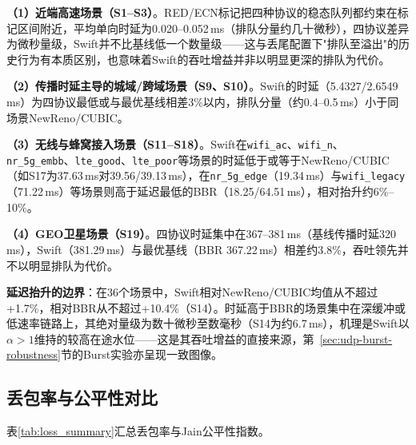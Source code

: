 \textbf{（1）近端高速场景（S1--S3）}。RED/ECN标记把四种协议的稳态队列都约束在标记区间附近，平均单向时延为0.020--0.052\,ms（排队分量约几十微秒），四协议差异为微秒量级，Swift并不比基线低一个数量级——这与丢尾配置下"排队至溢出"的历史行为有本质区别，也意味着Swift的吞吐增益并非以明显更深的排队为代价。

\textbf{（2）传播时延主导的城域/跨域场景（S9、S10）}。Swift的时延（5.4327/2.6549\,ms）为四协议最低或与最优基线相差3\%以内，排队分量（约0.4--0.5\,ms）小于同场景NewReno/CUBIC。

\textbf{（3）无线与蜂窝接入场景（S11--S18）}。Swift在\texttt{wifi\_ac}、\texttt{wifi\_n}、\texttt{nr\_5g\_embb}、\texttt{lte\_good}、\texttt{lte\_poor}等场景的时延低于或等于NewReno/CUBIC（如S17为37.63\,ms对39.56/39.13\,ms），在\texttt{nr\_5g\_edge}（19.34\,ms）与\texttt{wifi\_legacy}（71.22\,ms）等场景则高于延迟最低的BBR（18.25/64.51\,ms），相对抬升约6\%--10\%。

\textbf{（4）GEO卫星场景（S19）}。四协议时延集中在367--381\,ms（基线传播时延320\,ms），Swift（381.29\,ms）与最优基线（BBR 367.22\,ms）相差约3.8\%，吞吐领先并不以明显排队为代价。

\textbf{延迟抬升的边界}：在36个场景中，Swift相对NewReno/CUBIC均值从不超过+1.7\%，相对BBR从不超过+10.4\%（S14）。时延高于BBR的场景集中在深缓冲或低速率链路上，其绝对量级为数十微秒至数毫秒（S14为约6.7\,ms），机理是Swift以$\alpha > 1$维持的较高在途水位——这是其吞吐增益的直接来源，第~\ref{sec:udp-burst-robustness}节的Burst实验亦呈现一致图像。

\subsection{丢包率与公平性对比}

表\ref{tab:loss_summary}汇总丢包率与Jain公平性指数。

